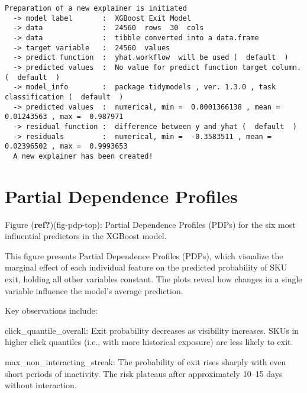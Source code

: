 \documentclass[
  letterpaper,
  DIV=11,
  numbers=noendperiod]{scrartcl}
\begin{document}
\begin{verbatim}
Preparation of a new explainer is initiated
  -> model label       :  XGBoost Exit Model 
  -> data              :  24560  rows  30  cols 
  -> data              :  tibble converted into a data.frame 
  -> target variable   :  24560  values 
  -> predict function  :  yhat.workflow  will be used (  default  )
  -> predicted values  :  No value for predict function target column. (  default  )
  -> model_info        :  package tidymodels , ver. 1.3.0 , task classification (  default  ) 
  -> predicted values  :  numerical, min =  0.0001366138 , mean =  0.01243563 , max =  0.987971  
  -> residual function :  difference between y and yhat (  default  )
  -> residuals         :  numerical, min =  -0.3583511 , mean =  0.02396502 , max =  0.9993653  
  A new explainer has been created!  
\end{verbatim}

\begin{figure}


\caption{\label{fig-custom-permutation-vi}}

\end{figure}%

\section{Partial Dependence Profiles}\label{partial-dependence-profiles}

Figure (\textbf{ref?})(fig-pdp-top): Partial Dependence Profiles (PDPs)
for the six most influential predictors in the XGBoost model.

This figure presents Partial Dependence Profiles (PDPs), which visualize
the marginal effect of each individual feature on the predicted
probability of SKU exit, holding all other variables constant. The plots
reveal how changes in a single variable influence the model's average
prediction.

Key observations include:

click\_quantile\_overall: Exit probability decreases as visibility
increases. SKUs in higher click quantiles (i.e., with more historical
exposure) are less likely to exit.

max\_non\_interacting\_streak: The probability of exit rises sharply
with even short periods of inactivity. The risk plateaus after
approximately 10--15 days without interaction.
\end{document}
